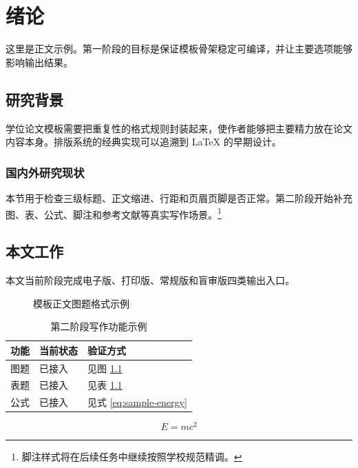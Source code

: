 \chapter{绪论}

这里是正文示例。第一阶段的目标是保证模板骨架稳定可编译，并让主要选项能够影响输出结果。

\section{研究背景}

学位论文模板需要把重复性的格式规则封装起来，使作者能够把主要精力放在论文内容本身。排版系统的经典实现可以追溯到 \LaTeX{} 的早期设计\cite{lamport1994latex}。

\subsection{国内外研究现状}

本节用于检查三级标题、正文缩进、行距和页眉页脚是否正常。第二阶段开始补充图、表、公式、脚注和参考文献等真实写作场景。\footnote{脚注样式将在后续任务中继续按照学校规范精调。}

\section{本文工作}

本文当前阶段完成电子版、打印版、常规版和盲审版四类输出入口。

\begin{figure}[htbp]
  \centering
  \fbox{\rule{0pt}{3cm}\rule{0.72\textwidth}{0pt}}
  \caption{模板正文图题格式示例}
  \label{fig:body-example}
\end{figure}

\begin{table}[htbp]
  \centering
  \caption{第二阶段写作功能示例}
  \label{tab:phase-two}
  \begin{tabular}{lll}
    \toprule
    功能 & 当前状态 & 验证方式\\
    \midrule
    图题 & 已接入 & 见图 \ref{fig:body-example}\\
    表题 & 已接入 & 见表 \ref{tab:phase-two}\\
    公式 & 已接入 & 见式 \eqref{eq:sample-energy}\\
    \bottomrule
  \end{tabular}
\end{table}

\begin{equation}
  E = mc^2
  \label{eq:sample-energy}
\end{equation}
